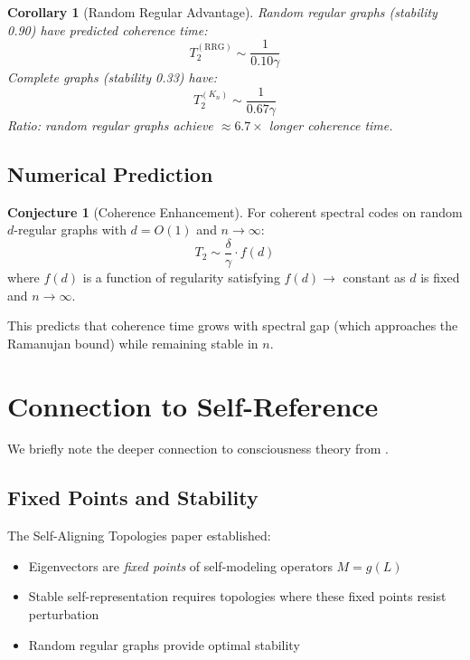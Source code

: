 \documentclass[11pt,a4paper]{article}
\newtheorem{corollary}[theorem]{Corollary}
\theoremstyle{definition}
\newtheorem{conjecture}[theorem]{Conjecture}
\begin{document}
\begin{corollary}[Random Regular Advantage]
Random regular graphs (stability 0.90) have predicted coherence time:
\begin{equation}
    T_2^{(\text{RRG})} \sim \frac{1}{0.10\gamma}
\end{equation}
Complete graphs (stability 0.33) have:
\begin{equation}
    T_2^{(K_n)} \sim \frac{1}{0.67\gamma}
\end{equation}
Ratio: random regular graphs achieve $\approx 6.7\times$ longer coherence time.
\end{corollary}

\subsection{Numerical Prediction}

\begin{conjecture}[Coherence Enhancement]
\label{conj:enhancement}
For coherent spectral codes on random $d$-regular graphs with $d = O(1)$ and $n \to \infty$:
\begin{equation}
    T_2 \sim \frac{\delta}{\gamma} \cdot f(d)
\end{equation}
where $f(d)$ is a function of regularity satisfying $f(d) \to$ constant as $d$ is fixed and $n \to \infty$.

This predicts that coherence time grows with spectral gap (which approaches the Ramanujan bound) while remaining stable in $n$.
\end{conjecture}

\section{Connection to Self-Reference}
\label{sec:selfref}

We briefly note the deeper connection to consciousness theory from \cite{benshalom2026selfaligning}.

\subsection{Fixed Points and Stability}

The Self-Aligning Topologies paper established:
\begin{itemize}[noitemsep]
    \item Eigenvectors are \emph{fixed points} of self-modeling operators $M = g(L)$
    \item Stable self-representation requires topologies where these fixed points resist perturbation
    \item Random regular graphs provide optimal stability
\end{itemize}
\end{document}
